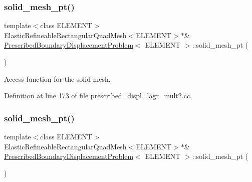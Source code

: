 \mbox{\label{classPrescribedBoundaryDisplacementProblem_ac0fc3028f61cec5ac4b01670d7728934}} 
\subsubsection{\texorpdfstring{solid\+\_\+mesh\+\_\+pt()}{solid\_mesh\_pt()}\hspace{0.1cm}{\footnotesize\ttfamily [1/3]}}
{\footnotesize\ttfamily template$<$class E\+L\+E\+M\+E\+NT$>$ \\
Elastic\+Refineable\+Rectangular\+Quad\+Mesh$<$E\+L\+E\+M\+E\+NT$>$$\ast$\& \hyperlink{classPrescribedBoundaryDisplacementProblem}{Prescribed\+Boundary\+Displacement\+Problem}$<$ E\+L\+E\+M\+E\+NT $>$\+::solid\+\_\+mesh\+\_\+pt (\begin{DoxyParamCaption}{ }\end{DoxyParamCaption})\hspace{0.3cm}{\ttfamily [inline]}}



Access function for the solid mesh. 



Definition at line 173 of file prescribed\+\_\+displ\+\_\+lagr\+\_\+mult2.\+cc.

\mbox{\label{classPrescribedBoundaryDisplacementProblem_ac0fc3028f61cec5ac4b01670d7728934}} 
\subsubsection{\texorpdfstring{solid\+\_\+mesh\+\_\+pt()}{solid\_mesh\_pt()}\hspace{0.1cm}{\footnotesize\ttfamily [2/3]}}
{\footnotesize\ttfamily template$<$class E\+L\+E\+M\+E\+NT$>$ \\
Elastic\+Refineable\+Rectangular\+Quad\+Mesh$<$E\+L\+E\+M\+E\+NT$>$$\ast$\& \hyperlink{classPrescribedBoundaryDisplacementProblem}{Prescribed\+Boundary\+Displacement\+Problem}$<$ E\+L\+E\+M\+E\+NT $>$\+::solid\+\_\+mesh\+\_\+pt (\begin{DoxyParamCaption}{ }\end{DoxyParamCaption})\hspace{0.3cm}{\ttfamily [inline]}}



